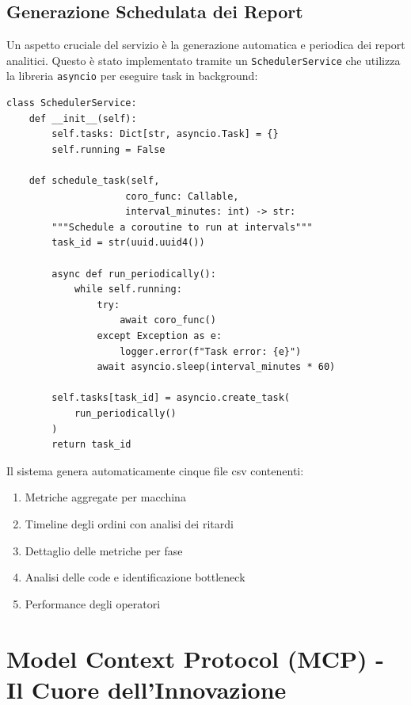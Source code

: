 \subsection{Generazione Schedulata dei Report}
Un aspetto cruciale del servizio è la generazione automatica e periodica dei report analitici. Questo è stato implementato tramite un \texttt{SchedulerService} che utilizza la libreria \texttt{asyncio} per eseguire task in background:

\begin{listing}[H]
\begin{verbatim}
class SchedulerService:
    def __init__(self):
        self.tasks: Dict[str, asyncio.Task] = {}
        self.running = False
    
    def schedule_task(self, 
                     coro_func: Callable, 
                     interval_minutes: int) -> str:
        """Schedule a coroutine to run at intervals"""
        task_id = str(uuid.uuid4())
        
        async def run_periodically():
            while self.running:
                try:
                    await coro_func()
                except Exception as e:
                    logger.error(f"Task error: {e}")
                await asyncio.sleep(interval_minutes * 60)
        
        self.tasks[task_id] = asyncio.create_task(
            run_periodically()
        )
        return task_id
\end{verbatim}
\caption{Implementazione dello scheduler}
\label{listing:scheduler-implementation}
\end{listing}

Il sistema genera automaticamente cinque file \gls{csv} contenenti:
\begin{enumerate}
    \item Metriche aggregate per macchina
    \item Timeline degli ordini con analisi dei ritardi
    \item Dettaglio delle metriche per fase
    \item Analisi delle code e identificazione bottleneck
    \item Performance degli operatori
\end{enumerate}

\section{Model Context Protocol (MCP) - Il Cuore dell'Innovazione}
\label{sec:mcp_implementation}

